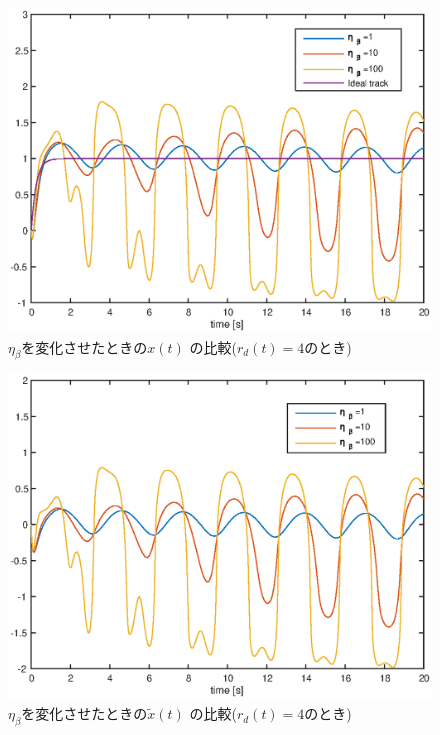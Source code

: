 \documentclass[a4paper,12pt]{jarticle}
\begin{document}
%
%
\begin{figure}[htb]
    \begin{center}
       \includegraphics[width=140mm]{fig/x_rd4_Etab.eps}
        \caption{$\eta_\beta$を変化させたときの$x(t)$
	 の比較($r_d(t)=4$のとき)}
        \label{fig:x_rd4etab}
    \end{center}
\end{figure}
%
%
\begin{figure}[htb]
    \begin{center}
       \includegraphics[width=140mm]{fig/x_tilde_etab.eps}
        \caption{$\eta_\beta$を変化させたときの$\tilde{x}(t)$
	 の比較($r_d(t)=4$のとき)}
        \label{fig:x_tilde_etab}
    \end{center}
\end{figure}
\end{document}
